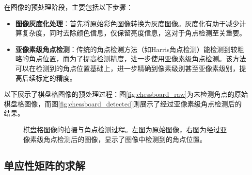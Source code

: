 \documentclass[hyperref,a4paper,UTF8]{ctexart}
\begin{document}
在图像的预处理阶段，主要包括以下步骤：

\begin{itemize}
    \item \textbf{图像灰度化处理}：首先将原始彩色图像转换为灰度图像。灰度化有助于减少计算复杂度，同时去除颜色信息，仅保留亮度信息，这对于角点检测至关重要。
    \item \textbf{亚像素级角点检测}：传统的角点检测方法（如Harris角点检测）能检测到较粗略的角点位置，而为了提高检测精度，进一步使用亚像素级角点检测。该方法可以在检测到的角点位置基础上，进一步精确到像素级别甚至亚像素级别，提高后续标定的精度。
\end{itemize}

以下展示了棋盘格图像的预处理过程：图\ref{fig:chessboard_raw}为未检测角点的原始棋盘格图像，而图\ref{fig:chessboard_detected}则展示了经过亚像素级角点检测后的结果。

\begin{figure}[h]
    \centering
    \caption{棋盘格图像的拍摄与角点检测过程。左图为原始图像，右图为经过亚像素级角点检测后的图像，显示了图像中检测到的角点位置。}
\end{figure}

\subsection{单应性矩阵的求解}
\end{document}
